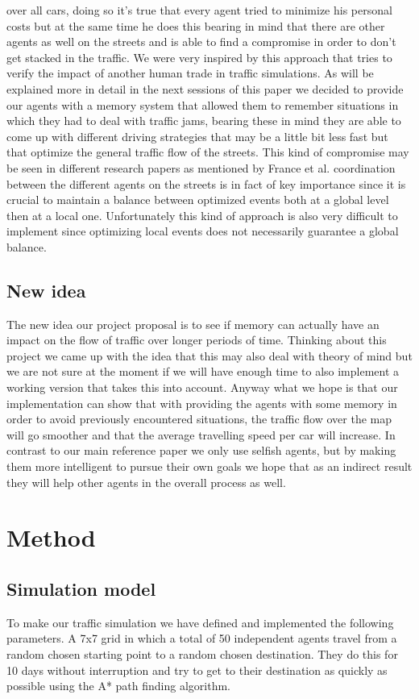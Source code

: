 \documentclass[a4paper,hidelinks]{article}
\begin{document}
over all cars, doing so it's true that every agent tried to minimize his personal costs but at the same time he does this bearing in mind that there are other agents as well on the streets and is able to find a compromise in order to don't get stacked in the traffic. We were very inspired by this approach that tries to verify the impact of another human trade in traffic simulations. As will be explained more in detail in the next sessions of this paper we decided to provide our agents with a memory system that allowed them to remember situations in which they had to deal with traffic jams, bearing these in mind they are able to come up with different driving strategies that may be a little bit less fast but that optimize the general traffic flow of the streets.
This kind of compromise may be seen in different research papers as mentioned by France et al. \cite{france2003multiagent} coordination between the different agents on the streets is in fact of key importance since it is crucial to maintain a balance between optimized events both at a global level then at a local one. Unfortunately this kind of approach is also very difficult to implement since optimizing local events does not necessarily guarantee a global balance.         

\subsection{New idea}
The new idea our project proposal is to see if memory can actually have an impact on the flow of traffic over longer periods of time. Thinking about this project we came up with the idea that this may also deal with theory of mind but we are not sure at the moment if we will have enough time to also implement a working version that takes this into account. Anyway what we hope is that our implementation can show that with providing the agents with some memory in order to avoid previously encountered situations, the traffic flow over the map will go smoother and that the average travelling speed per car will increase. In contrast to our main reference paper \cite{gabel2012cooperative} we only use selfish agents, but by making them more intelligent to pursue their own goals we hope that as an indirect result they will help other agents in the overall process as well.

\section{Method}
\subsection{Simulation model}
To make our traffic simulation we have defined and implemented the following parameters. A 7x7 grid in which a total of 50 independent agents travel from a random chosen starting point to a random chosen destination. They do this for 10 days without interruption and try to get to their destination as quickly as possible using the A* path finding algorithm.
\end{document}
